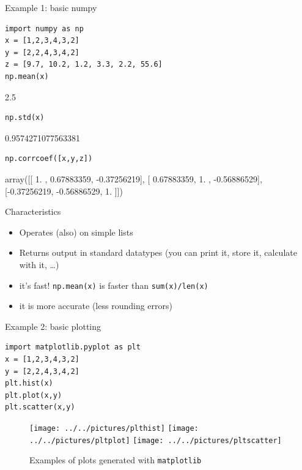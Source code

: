 \documentclass[handout]{beamer}
\begin{document}
\begin{frame}[fragile]{Example 1: basic numpy}
\begin{lstlisting}
import numpy as np
x = [1,2,3,4,3,2]
y = [2,2,4,3,4,2]
z = [9.7, 10.2, 1.2, 3.3, 2.2, 55.6]
np.mean(x)
\end{lstlisting}
\begin{lstlistingoutput}
2.5
\end{lstlistingoutput}
\begin{lstlisting}
np.std(x)
\end{lstlisting}
\begin{lstlistingoutput}
0.9574271077563381
\end{lstlistingoutput}

\begin{lstlisting}
np.corrcoef([x,y,z])
\end{lstlisting}

\begin{lstlistingoutput}
array([[ 1.        ,  0.67883359, -0.37256219],
       [ 0.67883359,  1.        , -0.56886529],
       [-0.37256219, -0.56886529,  1.        ]])
\end{lstlistingoutput}

\end{frame}

\begin{frame}{Characteristics}
\begin{itemize}
	\item Operates (also) on simple lists
	\item Returns output in standard datatypes (you can print it, store it, calculate with it, \ldots)
	\item it's fast! \texttt{np.mean(x)} is faster than \texttt{sum(x)/len(x)}
	\item it is more accurate (less rounding errors) 
\end{itemize}
\end{frame}





\begin{frame}[fragile]{Example 2: basic plotting}
\begin{lstlisting}
import matplotlib.pyplot as plt
x = [1,2,3,4,3,2]
y = [2,2,4,3,4,2]
plt.hist(x)
plt.plot(x,y)
plt.scatter(x,y)
\end{lstlisting}


\begin{figure}[h]
	\centering
	\texttt{[image: ../../pictures/plthist]}\hfill
	\texttt{[image: ../../pictures/pltplot]}\hfill
	\texttt{[image: ../../pictures/pltscatter]}
	\caption{\label{fig:matplotlib}Examples of plots generated with \texttt{matplotlib}}
\end{figure}

\end{frame}
\end{document}
